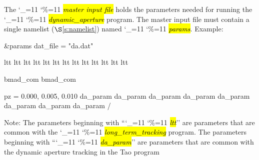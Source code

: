\documentclass{hitec}
\newcommand\dottcmd[1]{\hl{\em#1}\endgroup}
\newcommand{\vn}{\begingroup\catcode`\_=11 \catcode`\%=11 \dottcmd}
\newcommand{\da}{\vn{dynamic_aperture}\xspace}
\newcommand{\sref}[1]{$\S$\ref{#1}}
\newcommand{\ltt}{\vn{long_term_tracking}\xspace}
\begin{document}
The \vn{master input file} holds the parameters needed for running the \da program. The master input
file must contain a single namelist (\sref{s:namelist}) named \vn{params}.  Example:
\begin{code}
&params
  dat_file = "da.dat"

  ltt%
  ltt%
  ltt%
  ltt%
  ltt%
  ltt%
  ltt%
  ltt%
  ltt%
  ltt%
  ltt%
  ltt%
  ltt%

  bmad_com%
  bmad_com%

  pz = 0.000, 0.005, 0.010
  da_param%
  da_param%
  da_param%
  da_param%
  da_param%
  da_param%
  da_param%
  da_param%
/
\end{code}
Note: The parameters beginning with ``\vn{ltt}'' are parameters that are common with the
\ltt program. The parameters beginning with ``\vn{da_param}'' are parameters
that are common with the dynamic aperture tracking in the Tao program
\end{document}
